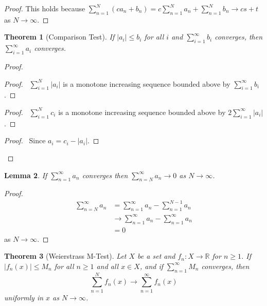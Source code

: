 \documentclass{report}
\let\qed\relax
\newtheorem{lm}{Lemma}[section]
\newtheorem{thm}[lm]{Theorem}
\theoremstyle{definition}
\begin{document}
  \begin{proof}
    \pf This holds because $\sum_{n=1}^N (c a_n + b_n) = c \sum_{n=1}^N a_n +
    \sum_{n=1}^N b_n \rightarrow cs + t$ as $N \rightarrow \infty$. \qed
  \end{proof}

  \begin{thm}[Comparison Test]
    If $|a_i| \leq b_i$ for all $i$ and $\sum_{i=1}^\infty b_i$ converges, then
    $\sum_{i=1}^\infty a_i$ converges.
  \end{thm}

  \begin{proof}
    \pf
    \begin{proof}
      \pf\ $\sum_{i=1}^N |a_i|$ is a monotone increasing sequence bounded above
      by $\sum_{i=1}^\infty b_i$.
    \end{proof}
    \begin{proof}
      \pf\ $\sum_{i=1}^N c_i$ is a monotone increasing sequence bounded above
      by
      $2 \sum_{i=1}^\infty |a_i|$.
    \end{proof}
    \qedstep
    \begin{proof}
      \pf\ Since $a_i = c_i - |a_i|$.
    \end{proof}
  \end{proof}

  \begin{lm}
    \label{lm:topology:metric:tail}
    If $\sum_{n=1}^\infty a_n$ converges then $\sum_{n=N}^\infty a_n
    \rightarrow 0$ as $N \rightarrow \infty$.
  \end{lm}

  \begin{proof}
    \pf
    \begin{align*}
      \sum_{n=N}^\infty a_n & = \sum_{n=1}^\infty a_n - \sum_{n=1}^{N-1} a_n \\
      & \rightarrow \sum_{n=1}^\infty a_n - \sum_{n=1}^\infty a_n \\
      & = 0
    \end{align*}
    as $N \rightarrow \infty$. \qed
  \end{proof}

  \begin{thm}[Weierstrass M-Test]
    Let $X$ be a set and $f_n : X \rightarrow \mathbb{R}$ for $n \geq 1$. If
    $|f_n(x)| \leq M_n$ for all $n \geq 1$ and all $x \in X$, and if
    $\sum_{n=1}^\infty M_n$ converges, then
    \[ \sum_{n=1}^N f_n(x) \rightarrow \sum_{n=1}^\infty f_n(x) \]
    uniformly in $x$ as $N \rightarrow \infty$.
  \end{thm}
\end{document}
